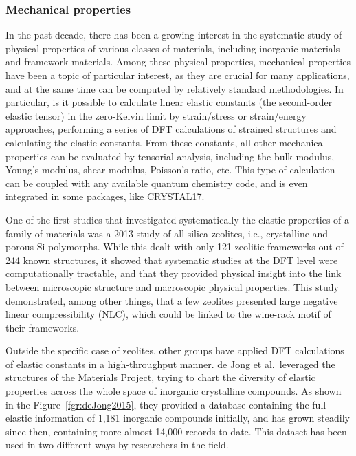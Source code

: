 \documentclass[main.tex]{subfiles}
\begin{document}
\subsubsection{Mechanical properties}

In the past decade, there has been a growing interest in the systematic study of physical properties of various classes of materials, including inorganic materials and framework materials. Among these physical properties, mechanical properties have been a topic of particular interest, as they are crucial for many applications, and at the same time can be computed by relatively standard methodologies. In particular, is it possible to calculate linear elastic constants (the second-order elastic tensor) in the zero-Kelvin limit by strain/stress or strain/energy approaches, performing a series of DFT calculations of strained structures and calculating the elastic constants. From these constants, all other mechanical properties can be evaluated by tensorial analysis,\autocite{Marmier_2010} including the bulk modulus, Young's modulus, shear modulus, Poisson's ratio, etc. This type of calculation can be coupled with any available quantum chemistry code,\autocite{Golesorkhtabar_2013} and is even integrated in some packages, like CRYSTAL17.\autocite{Dovesi_2018}

One of the first studies that investigated systematically the elastic properties of a family of materials was a 2013 study of all-silica zeolites,\autocite{Coudert_2013} i.e., crystalline and porous Si polymorphs. While this dealt with only 121 zeolitic frameworks out of 244 known structures, it showed that systematic studies at the DFT level were computationally tractable, and that they provided physical insight into the link between microscopic structure and macroscopic physical properties. This study demonstrated, among other things, that a few zeolites presented large negative linear compressibility (NLC), which could be linked to the wine-rack motif of their frameworks.

Outside the specific case of zeolites, other groups have applied DFT calculations of elastic constants in a high-throughput manner. de Jong et al.\ leveraged the structures of the Materials Project\autocite{Matgenome, Jain_2013}, trying to chart the diversity of elastic properties across the whole space of inorganic crystalline compounds.\autocite{deJong_2015} As shown in the Figure~\ref{fgr:deJong2015}, they provided a database containing the full elastic information of 1,181 inorganic compounds initially, and has grown steadily since then, containing more almost 14,000 records to date.\autocite{MaterialsProject} This dataset has been used in two different ways by researchers in the field.
\end{document}
